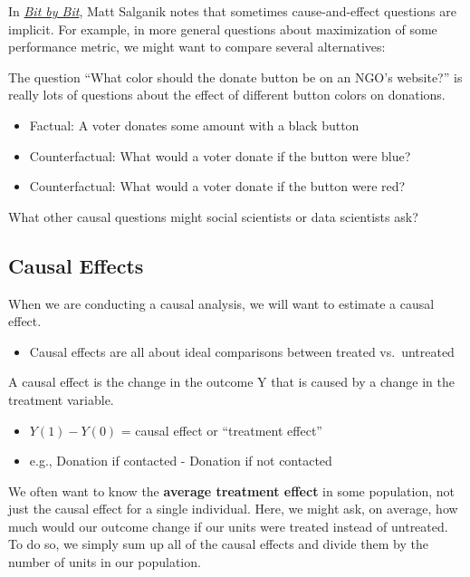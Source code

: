 \documentclass[
  letterpaper,
  DIV=11,
  numbers=noendperiod]{scrreprt}
\providecommand{\tightlist}{%
  \setlength{\itemsep}{0pt}\setlength{\parskip}{0pt}}\usepackage{longtable,booktabs,array}
\begin{document}
In
\href{https://www.bitbybitbook.com/en/1st-ed/running-experiments/}{\emph{Bit
by Bit}}, Matt Salganik notes that sometimes cause-and-effect questions
are implicit. For example, in more general questions about maximization
of some performance metric, we might want to compare several
alternatives:

The question ``What color should the donate button be on an NGO's
website?'' is really lots of questions about the effect of different
button colors on donations.

\begin{itemize}
\tightlist
\item
  Factual: A voter donates some amount with a black button
\item
  Counterfactual: What would a voter donate if the button were blue?
\item
  Counterfactual: What would a voter donate if the button were red?
\end{itemize}

What other causal questions might social scientists or data scientists
ask?

\hypertarget{causal-effects}{%
\subsection{Causal Effects}\label{causal-effects}}

When we are conducting a causal analysis, we will want to estimate a
causal effect.

\begin{itemize}
\tightlist
\item
  Causal effects are all about ideal comparisons between treated
  vs.~untreated
\end{itemize}

A causal effect is the change in the outcome Y that is caused by a
change in the treatment variable.

\begin{itemize}
\tightlist
\item
  \(Y(1) - Y(0)\) = causal effect or ``treatment effect''
\item
  e.g., Donation if contacted - Donation if not contacted
\end{itemize}

We often want to know the \textbf{average treatment effect} in some
population, not just the causal effect for a single individual. Here, we
might ask, on average, how much would our outcome change if our units
were treated instead of untreated. To do so, we simply sum up all of the
causal effects and divide them by the number of units in our population.
\end{document}
